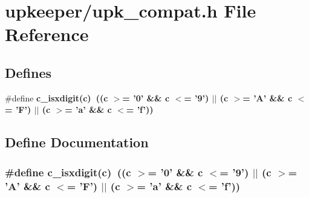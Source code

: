 \section{upkeeper/upk\_\-compat.h File Reference}
\label{upk__compat_8h}
\subsection*{Defines}
\begin{CompactItemize}
\item 
\#define \bf{c\_\-isxdigit}(c)~((c $>$= '0' \&\& c $<$= '9') $|$$|$ (c $>$= 'A' \&\& c $<$= 'F') $|$$|$ (c $>$= 'a' \&\& c $<$= 'f'))
\end{CompactItemize}


\subsection{Define Documentation}
\subsubsection{\setlength{\rightskip}{0pt plus 5cm}\#define c\_\-isxdigit(c)~((c $>$= '0' \&\& c $<$= '9') $|$$|$ (c $>$= 'A' \&\& c $<$= 'F') $|$$|$ (c $>$= 'a' \&\& c $<$= 'f'))}\label{upk__compat_8h_6a044496f3cd5d54651bbd06c834fdbe}


